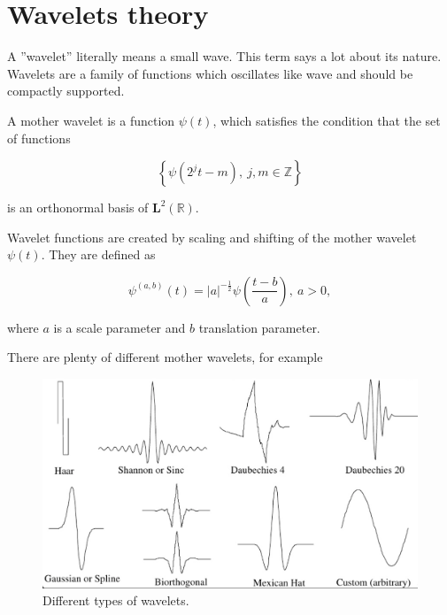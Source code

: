 \chapter{Wavelets theory}
A ''wavelet'' literally means a small wave. This term says a lot about its nature. Wavelets are a family of functions which oscillates like wave and should be compactly supported.

\begin{defn}
A mother wavelet is a function $\psi(t)$, which satisfies the condition that the set of functions

\begin{equation}
\left\{\psi(2^j t-m),\ j,m\in\mathbb{Z}\right\}
\end{equation}

is an orthonormal basis of $\mathbf{L}^2(\mathbb{R})$.
\end{defn}

\begin{defn}
Wavelet functions are created by scaling and shifting of the mother wavelet $\psi(t)$. They are defined as

\begin{equation}
\label{eq:wavelets}
\psi^{(a,b)}(t)=|a|^{-\frac{1}{2}} \psi\left(\frac{t-b}{a}\right),\ a>0,
\end{equation}

where $a$ is a scale parameter and $b$ translation parameter.
\end{defn}

There are plenty of different mother wavelets, for example

\begin{figure}[h]
	\centering
	\includegraphics[width=\textwidth]{wavelets_with_bottom_line.png}
	\caption{Different types of wavelets.}
	\label{fig:wavelets}
\end{figure}

